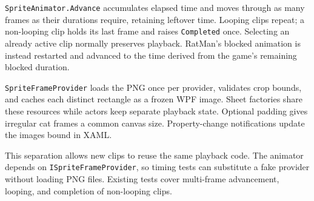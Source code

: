 \texttt{SpriteAnimator.Advance} accumulates elapsed time and moves through as many frames as their durations require, retaining leftover time. Looping clips repeat; a non-looping clip holds its last frame and raises \texttt{Completed} once. Selecting an already active clip normally preserves playback. RatMan's blocked animation is instead restarted and advanced to the time derived from the game's remaining blocked duration.

\texttt{SpriteFrameProvider} loads the PNG once per provider, validates crop bounds, and caches each distinct rectangle as a frozen WPF image. Sheet factories share these resources while actors keep separate playback state. Optional padding gives irregular cat frames a common canvas size. Property-change notifications update the images bound in XAML.

This separation allows new clips to reuse the same playback code. The animator depends on \texttt{ISpriteFrameProvider}, so timing tests can substitute a fake provider without loading PNG files. Existing tests cover multi-frame advancement, looping, and completion of non-looping clips.
